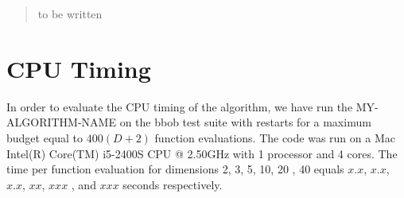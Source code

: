 \documentclass{sig-alternate}
\newcommand{\change}[1]{{\color{red} #1}}
\begin{document}

\maketitle
\begin{abstract}
to be written
\end{abstract}




%
%
%

\section{CPU Timing}
In order to evaluate the CPU timing of the algorithm, we have run the \change{MY-ALGORITHM-NAME} on the  \change{bbob test suite \cite{hansen2009fun}} with restarts for a maximum budget equal to \change{$400 (D + 2)$} function evaluations. The code was run on a \change{Mac Intel(R) Core(TM) i5-2400S CPU @ 2.50GHz} with \change{1} processor and \change{4} cores. The time per function evaluation for dimensions 2, 3, 5, 10, 20\change{, 40} equals \change{$x.x$}, \change{$x.x$}, \change{$x.x$}, \change{$xx$}, \change{$xxx$}\change{, and $xxx$} seconds respectively. 
\end{document}
